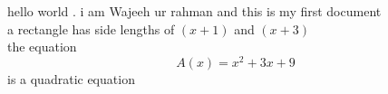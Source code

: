 \documentclass [12pt]{article}
\begin{document}
hello world . i am  Wajeeh ur rahman and this is \newline my first  document\\

a rectangle has side lengths of $(x+1)$ and $(x+3)$\\
the equation $$A(x)={x^2+3x+9}$$ is a quadratic equation
\end{document}

